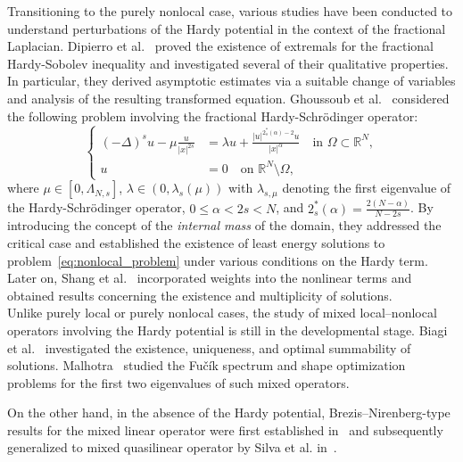 \documentclass[11pt]{article}
\begin{document}
Transitioning to the purely nonlocal case, various studies have been conducted to understand perturbations of the Hardy potential in the context of the fractional Laplacian. Dipierro et al.~\cite{dipierro2016fractionalwithHardy} proved the existence of extremals for the fractional Hardy-Sobolev inequality and investigated several of their qualitative properties. In particular, they derived asymptotic estimates via a suitable change of variables and analysis of the resulting transformed equation. Ghoussoub et al.~\cite{ghoussoub_fractional_hardy} considered the following problem involving the fractional Hardy-Schrödinger operator:
\begin{equation}\label{eq:nonlocal_problem}
\left\{
\begin{aligned}
    (-\Delta)^s u  - \mu \frac{u}{|x|^{2s}} &= \lambda u + \frac{|u|^{2^*_s(\alpha)-2} u}{|x|^{\alpha}} \quad \text{in } \Omega \subset \mathbb{R}^N, \\
    u &= 0 \quad \text{on } \mathbb{R}^N \setminus \Omega,
\end{aligned}
\right.
\end{equation}
where \( \mu \in [0, \Lambda_{N,s}] \), \( \lambda \in (0, \lambda_s(\mu)) \) with \( \lambda_{s,\mu} \) denoting the first eigenvalue of the Hardy-Schrödinger operator, \( 0 \leq \alpha < 2s < N \), and \( 2^*_s(\alpha) = \frac{2(N - \alpha)}{N - 2s} \). By introducing the concept of the \emph{internal mass} of the domain, they addressed the critical case and established the existence of least energy solutions to problem~\eqref{eq:nonlocal_problem} under various conditions on the Hardy term. Later on, Shang et al.~\cite{shang_zhang_fractional_laplacian} incorporated weights into the nonlinear terms and obtained results concerning the existence and multiplicity of solutions.\\
Unlike purely local or purely nonlocal cases, the study of mixed local–nonlocal operators involving the Hardy potential is still in the developmental stage. Biagi et al.~\cite{biagi2024mixed_hardy} investigated the existence, uniqueness, and optimal summability of solutions. Malhotra~\cite{malhotra2025eigenvalues} studied the Fučík spectrum and shape optimization problems for the first two eigenvalues of such mixed operators. 

On the other hand, in the absence of the Hardy potential, Brezis–Nirenberg-type results for the mixed linear operator were first established in~\cite{biagi2022brezis} and subsequently generalized to mixed quasilinear operator by Silva et al. in~\cite{silva2024mixed}. 
\end{document}
